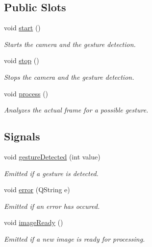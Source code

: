 \subsection*{Public Slots}
\begin{DoxyCompactItemize}
\item 
void \hyperlink{class_camera_processor_a8fc5313c16268861a14f58891421592f}{start} ()
\begin{DoxyCompactList}\small\item\em Starts the camera and the gesture detection. \end{DoxyCompactList}\item 
void \hyperlink{class_camera_processor_af6547d64e6fad393441286535e908e40}{stop} ()
\begin{DoxyCompactList}\small\item\em Stops the camera and the gesture detection. \end{DoxyCompactList}\item 
void \hyperlink{class_camera_processor_ae0876748974a262d3481163ab876a074}{process} ()
\begin{DoxyCompactList}\small\item\em Analyzes the actual frame for a possible gesture. \end{DoxyCompactList}\end{DoxyCompactItemize}
\subsection*{Signals}
\begin{DoxyCompactItemize}
\item 
void \hyperlink{class_camera_processor_a8e221894fdcae9f1a9e7628c7ed54dca}{gesture\+Detected} (int value)
\begin{DoxyCompactList}\small\item\em Emitted if a gesture is detected. \end{DoxyCompactList}\item 
void \hyperlink{class_camera_processor_a79dc2456e9146a17edba62104bf46fec}{error} (Q\+String e)
\begin{DoxyCompactList}\small\item\em Emitted if an error has occured. \end{DoxyCompactList}\item 
void \hyperlink{class_camera_processor_a3585468dcdcc49cc4553f1761bd481dc}{image\+Ready} ()
\begin{DoxyCompactList}\small\item\em Emitted if a new image is ready for processing. \end{DoxyCompactList}\end{DoxyCompactItemize}
